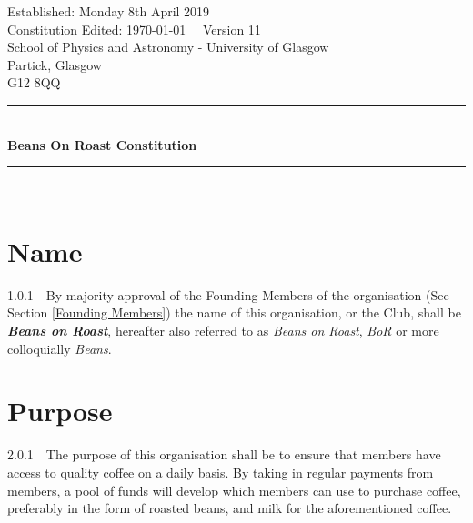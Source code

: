 \documentclass[a4paper,11pt]{article}
\begin{document}
\begin{titlepage} %
\begin{center} %

Established: Monday 8th April 2019\\
Constitution Edited: \today $\quad$ Version 11\\[1cm]

School of Physics and Astronomy - University of Glasgow\\
Partick, Glasgow\\
G12 8QQ\\[4mm] %
\rule[0.4cm]{15cm}{.2pt}\\ %
{\Huge \textbf{Beans On Roast Constitution}}
\rule[0.4cm]{15cm}{.2pt}\\ %
\end{center}

\centering
{}

\tableofcontents

\end{titlepage}



\section{Name}
\label{Name}
1.0.1$\quad$By majority approval of the Founding Members of the organisation (See Section \ref{Founding Members}) the name of this organisation, or the Club, shall be \textit{\textbf{Beans on Roast}}, hereafter also referred to as \textit{Beans on Roast}, \textit{BoR} or more colloquially \textit{Beans}.
\section{Purpose}
\label{Purpose}
2.0.1$\quad$The purpose of this organisation shall be to ensure that members have access to quality coffee on a daily basis. By taking in regular payments from members, a pool of funds will develop which members can use to purchase coffee, preferably in the form of roasted beans, and milk for the aforementioned coffee. \\
\end{document}
